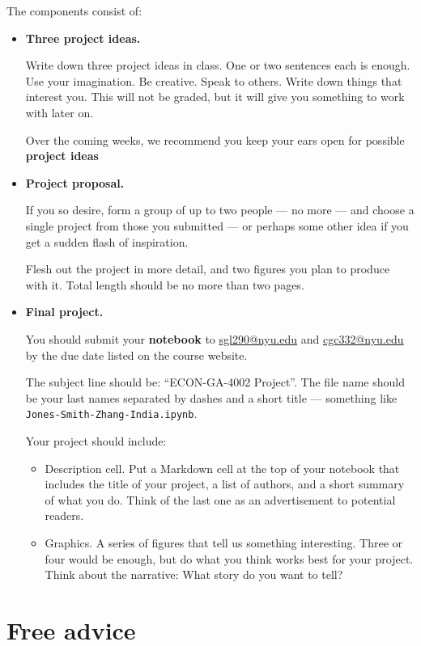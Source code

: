 \documentclass[11pt]{article}
\begin{document}
The components consist of:
\begin{itemize}

\item {\bf Three project ideas.}

Write down three project ideas in class. One or two sentences each is enough.
Use your imagination.  Be creative.  Speak to others. Write down things that
interest you. This will not be graded, but it will give you something to work
with later on.

Over the coming weeks, we recommend you keep your ears open for possible
{\bf project ideas}

\item{\bf Project proposal.}

If you so desire, form a group of up to two people --- no more --- and choose
a single project from those you submitted --- or perhaps some other idea if you
get a sudden flash of inspiration.

Flesh out the project in more detail, and two figures you plan to produce with
it. Total length should be no more than two pages.

\item {\bf Final project.}

You should submit your {\bf notebook\/} to \href{mailto:sgl290@nyu.edu}{sgl290@nyu.edu} and
\href{mailto:cgc332@nyu.edu}{cgc332@nyu.edu} by the due date listed on the course website.

The subject line should be:  ``ECON-GA-4002 Project''. The
file name should be your last names separated by dashes and a short title ---
something like {\tt Jones-Smith-Zhang-India.ipynb}.

Your project should include:

\begin{itemize}
  \item Description cell.  Put a Markdown cell at the top of your notebook that
  includes the title of your project, a list of authors, and a short summary of
  what you do. Think of the last one as an advertisement to potential readers.
  \item Graphics. A series of figures that tell us something interesting. Three
  or four would be enough, but do what you think works best for your project.
  Think about the narrative:  What story do you want to tell?
\end{itemize}

\end{itemize}


\section*{Free advice}
\end{document}

